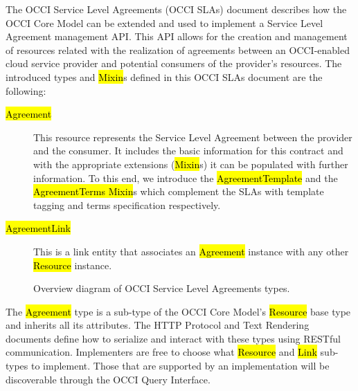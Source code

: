 \documentclass[10pt,a4paper]{article}
\begin{document}
The OCCI Service Level Agreements (OCCI SLAs) document describes how the OCCI Core Model \cite{occi:core} can be extended and used to implement a Service Level Agreement management API. This API allows for the creation and management of resources related with the realization of agreements between an OCCI-enabled cloud service provider and potential consumers of the provider’s resources. The introduced types and \hl{Mixin}s defined in this OCCI SLAs document are the following:


\begin{description}
\item[\hl{Agreement }] This resource represents the Service Level Agreement between the provider and the consumer. It includes the basic information for this contract and with the appropriate extensions (\hl{Mixin}s) it can be populated with further information. To this end, we introduce the \hl{AgreementTemplate} and the \hl{AgreementTerms Mixin}s which complement the SLAs with template tagging and terms specification respectively.

\item[\hl{AgreementLink }] This is a link entity that associates an \hl{Agreement} instance with any other \hl{Resource} instance.
\end{description}


\begin{figure}[!h]
	{\centering {} \par}
	\caption{Overview diagram of OCCI Service Level Agreements types.}
	\label{fig:sla_uml}
\end{figure}

The \hl{Agreement} type is a sub-type of the OCCI Core Model's \hl{Resource}
base type and inherits all its attributes. The HTTP Protocol \cite{occi:http_protocol} and Text
Rendering \cite{occi:text_rendering} documents define how to serialize and interact with
these types using RESTful communication. Implementers are free to
choose what \hl{Resource} and \hl{Link} sub-types to implement. Those
that are supported by an implementation will be discoverable through
the OCCI Query Interface.
\end{document}
